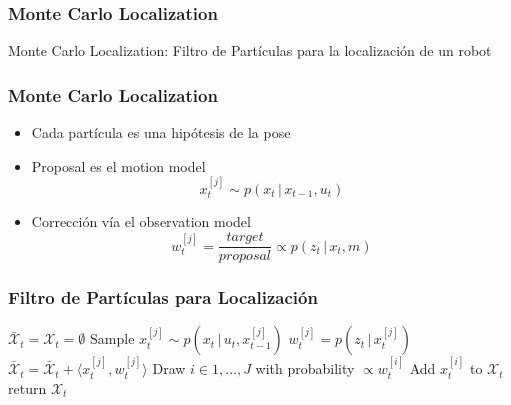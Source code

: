 \begin{frame}
    \frametitle{Monte Carlo Localization}

    Monte Carlo Localization: Filtro de Partículas para la localización de un robot

\end{frame}





\begin{frame}
    \frametitle{Monte Carlo Localization}
    \begin{itemize}
        \item Cada partícula es una hipótesis de la pose
        \item Proposal es el motion model
        \begin{equation*}
            x_t^{[j]} \sim p(x_t \, | \, x_{t-1}, u_t)
        \end{equation*}
        \item Corrección vía el observation model
        \begin{equation*}
            w_t^{[j]} = \frac{target}{proposal} \propto p(z_t \, | \, x_t, m)
        \end{equation*}
    \end{itemize}
\end{frame}

    
\begin{frame}
    \frametitle{Filtro de Partículas para Localización}
    \begin{algorithmic}[1]
        \State $\bar{\mathcal{X}}_t = \mathcal{X}_t = \emptyset$
            \State Sample $x_t^{[j]} \sim p(x_t \, | \, u_t, x_{t-1}^{[j]})$
            \State $w_t^{[j]} = p(z_t \, | \, x_t^{[j]})$
            \State $\bar{\mathcal{X}}_t = \bar{\mathcal{X}}_t + \langle x_t^{[j]}, w_t^{[j]}\rangle$
        \EndFor
            \State Draw $i \in 1,\ldots,J$ with probability $\propto w_t^{[i]}$
            \State Add $x_t^{[i]}$ to $\mathcal{X}_t$
        \EndFor
        \State return $\mathcal{X}_t$
    \EndProcedure
    \end{algorithmic}
\end{frame}
    
